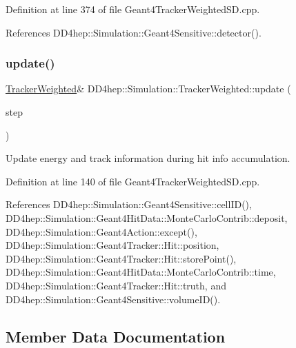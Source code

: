 Definition at line 374 of file Geant4\+Tracker\+Weighted\+S\+D.\+cpp.



References D\+D4hep\+::\+Simulation\+::\+Geant4\+Sensitive\+::detector().

\hypertarget{struct_d_d4hep_1_1_simulation_1_1_tracker_weighted_a8ffc0941260d20698a82015cd39cf744}{}\label{struct_d_d4hep_1_1_simulation_1_1_tracker_weighted_a8ffc0941260d20698a82015cd39cf744} 
\subsubsection{\texorpdfstring{update()}{update()}}
{\footnotesize\ttfamily \hyperlink{struct_d_d4hep_1_1_simulation_1_1_tracker_weighted}{Tracker\+Weighted}\& D\+D4hep\+::\+Simulation\+::\+Tracker\+Weighted\+::update (\begin{DoxyParamCaption}\item[{const G4\+Step $\ast$}]{step }\end{DoxyParamCaption})\hspace{0.3cm}{\ttfamily [inline]}}



Update energy and track information during hit info accumulation. 



Definition at line 140 of file Geant4\+Tracker\+Weighted\+S\+D.\+cpp.



References D\+D4hep\+::\+Simulation\+::\+Geant4\+Sensitive\+::cell\+I\+D(), D\+D4hep\+::\+Simulation\+::\+Geant4\+Hit\+Data\+::\+Monte\+Carlo\+Contrib\+::deposit, D\+D4hep\+::\+Simulation\+::\+Geant4\+Action\+::except(), D\+D4hep\+::\+Simulation\+::\+Geant4\+Tracker\+::\+Hit\+::position, D\+D4hep\+::\+Simulation\+::\+Geant4\+Tracker\+::\+Hit\+::store\+Point(), D\+D4hep\+::\+Simulation\+::\+Geant4\+Hit\+Data\+::\+Monte\+Carlo\+Contrib\+::time, D\+D4hep\+::\+Simulation\+::\+Geant4\+Tracker\+::\+Hit\+::truth, and D\+D4hep\+::\+Simulation\+::\+Geant4\+Sensitive\+::volume\+I\+D().



\subsection{Member Data Documentation}
\hypertarget{struct_d_d4hep_1_1_simulation_1_1_tracker_weighted_aeced4bab28aa79ad7bab14ca9ce02c79}{}\label{struct_d_d4hep_1_1_simulation_1_1_tracker_weighted_aeced4bab28aa79ad7bab14ca9ce02c79} 

